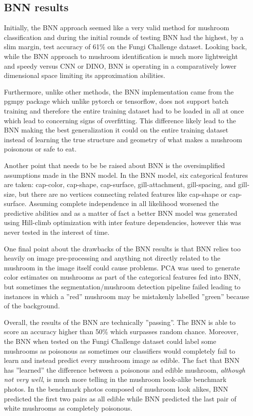 \documentclass[journal]{IEEEtran}
\begin{document}
\subsection{BNN results}
Initially, the BNN approach seemed like a very valid method for mushroom classification and during the initial rounds of testing BNN had the highest, by a slim margin, test accuracy of 61\% on the Fungi Challenge dataset. Looking back, while the BNN approach to mushroom identification is much more lightweight and speedy versus CNN or DINO, BNN is operating in a comparatively lower dimensional space limiting its approximation abilities.
\par
Furthermore, unlike other methods, the BNN implementation came from the pgmpy package which unlike pytorch or tensorflow, does not support batch training and therefore the entire training dataset had to be loaded in all at once which lead to concerning signs of overfitting. This difference likely lead to the BNN making the best generalization it could on the entire training dataset instead of learning the true structure and geometry of what makes a mushroom poisonous or safe to eat.
\par
Another point that needs to be be raised about BNN is the oversimplified assumptions made in the BNN model. In the BNN model, six categorical features are taken: cap-color, cap-shape, cap-surface, gill-attachment, gill-spacing, and gill-size, but there are no vertices connecting related features like cap-shape or cap-surface. Assuming complete independence in all likelihood worsened the predictive abilities and as a matter of fact a better BNN model was generated using Hill-climb optimization with inter feature dependencies, however this was never tested in the interest of time.
\par
One final point about the drawbacks of the BNN results is that BNN relies too heavily on image pre-processing and anything not directly related to the mushroom in the image itself could cause problems. PCA was used to generate color estimates on mushrooms as part of the categorical features fed into BNN, but sometimes the segmentation/mushroom detection pipeline failed leading to instances in which a ''red'' mushroom may be mistakenly labelled ''green'' because of the background.
\par
Overall, the results of the BNN are technically ''passing''. The BNN is able to score an accuracy higher than 50\% which surpasses random chance. Moreover, the BNN when tested on the Fungi Challenge dataset could label some mushrooms as poisonous as sometimes our classifiers would completely fail to learn and instead predict every mushroom image as edible. The fact that BNN has ''learned'' the difference between a poisonous and edible mushroom, \textit{although not very well}, is much more telling in the mushroom look-alike benchmark photos. In the benchmark photos composed of mushroom look alikes, BNN predicted the first two pairs as all edible while BNN predicted the last pair of white mushrooms as completely poisonous.
\end{document}
